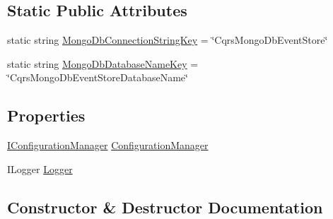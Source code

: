 \subsection*{Static Public Attributes}
\begin{DoxyCompactItemize}
\item 
static string \hyperlink{classCqrs_1_1MongoDB_1_1Events_1_1MongoDbEventStoreConnectionStringFactory_a0e1916a92e01f0b5cf15695478170d68_a0e1916a92e01f0b5cf15695478170d68}{Mongo\+Db\+Connection\+String\+Key} = \char`\"{}Cqrs\+Mongo\+Db\+Event\+Store\char`\"{}
\item 
static string \hyperlink{classCqrs_1_1MongoDB_1_1Events_1_1MongoDbEventStoreConnectionStringFactory_a5ea3576b77bf46894277b0bba8f5d2bb_a5ea3576b77bf46894277b0bba8f5d2bb}{Mongo\+Db\+Database\+Name\+Key} = \char`\"{}Cqrs\+Mongo\+Db\+Event\+Store\+Database\+Name\char`\"{}
\end{DoxyCompactItemize}
\subsection*{Properties}
\begin{DoxyCompactItemize}
\item 
\hyperlink{interfaceCqrs_1_1Configuration_1_1IConfigurationManager}{I\+Configuration\+Manager} \hyperlink{classCqrs_1_1MongoDB_1_1Events_1_1MongoDbEventStoreConnectionStringFactory_ae551f6493cce791272dcbfbedf8c18bf_ae551f6493cce791272dcbfbedf8c18bf}{Configuration\+Manager}
\item 
I\+Logger \hyperlink{classCqrs_1_1MongoDB_1_1Events_1_1MongoDbEventStoreConnectionStringFactory_a13fe1d0f10313e37c9eb1788db98cb23_a13fe1d0f10313e37c9eb1788db98cb23}{Logger}
\end{DoxyCompactItemize}


\subsection{Constructor \& Destructor Documentation}
\mbox{\label{classCqrs_1_1MongoDB_1_1Events_1_1MongoDbEventStoreConnectionStringFactory_afb24fa31922f1297f7d7d80c7b14ee14_afb24fa31922f1297f7d7d80c7b14ee14}} 
